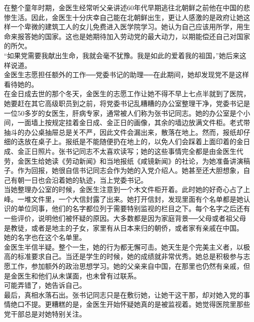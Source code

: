 在整个童年时期，金医生经常听父亲讲述60年代早期逃往北朝鲜之前他在中国的悲惨生活。因此，金医生十分庆幸自己能在北朝鲜出生，更让人感激的是政府让她这样一个卑微的建筑工人的女儿免费进入医学院学习。她认为自己应该用所学，用生命来报答她的国家。这也是她期待加入劳动党的最大动力，以期能偿还自己对国家的所欠。\\

“如果党需要我献出生命，我就会毫不犹豫。我是如此的爱着我的祖国，”她后来这样说道。\\

金医生志愿担任额外的工作──党委书记的助理──在此期间，她却发现党不是这样看待她的。\\

在金日成去世的那个冬天，金医生的志愿工作让她不得不早上七点半就到了医院，她要赶在其它高级职员到之前，将党委书记乱糟糟的办公室整理干净，党委书记是一位50多岁的女医生，肝病专家，通常被人们称为张书记同志。她的办公室是个小间，一面墙上按规定挂着金日成、金正日的画像，其余的墙边放满文件柜。老式带抽斗的办公桌抽屉总是关不严，因此文件会漏出来，散落在地上。然而，报纸却仔细的迭放在桌子上。报纸是不能随便扔在地上的，以免人们会踩着上面印着的金日成、金正日照片。张书记同志不太喜欢读写；她的这些事情完全都是由金医生代劳，金医生给她读《劳动新闻》和当地报纸《咸镜新闻》的社论，为她准备讲演稿子。作为回报，她很自信书记同志会作为她的入党介绍人。她甚至还大胆想象，自己有朝一日也会沿着她的轨迹，当上党委书记。\\

当她整理办公室的时候，金医生注意到一个木文件柜开着。此时她的好奇心占了上峰。一堆文件里，一个大信封露了出来。她打开信封，发现里面有个名单都是她认识的单位同事，他们的名字都位列于需要特别监视的栏目之下。每个名字之后还有一些评价，说明他们被怀疑的原因。大多数都是因为家庭背景──父母或者祖父母是教徒，或者是地主的子女，家里有从日本来归的朝侨，或者家有亲戚在中国。\\

她的名字也在这个名单里。\\

金医生半信半疑。整个一生，她的行为都无懈可击。她天生是个完美主义者，以极高的标准要求自己。当还是学生的时候，她的成绩就非常优秀。她总是积极参与志愿工作，参加额外的政治思想学习。她的父亲来自中国，在那里也仍然有亲戚，但是金医生和他们从未谋面，也未曾有过联系。\\

可能弄错了，她告诉自己。\\

最后，真相水落石出。张书记同志只是在敷衍她，让她干这干那，却对她入党的事情绝口不提。更糟糕的是，金医生开始怀疑她真的是被监视着。她觉得医院里那些党干部总是对她特别关注。\\

